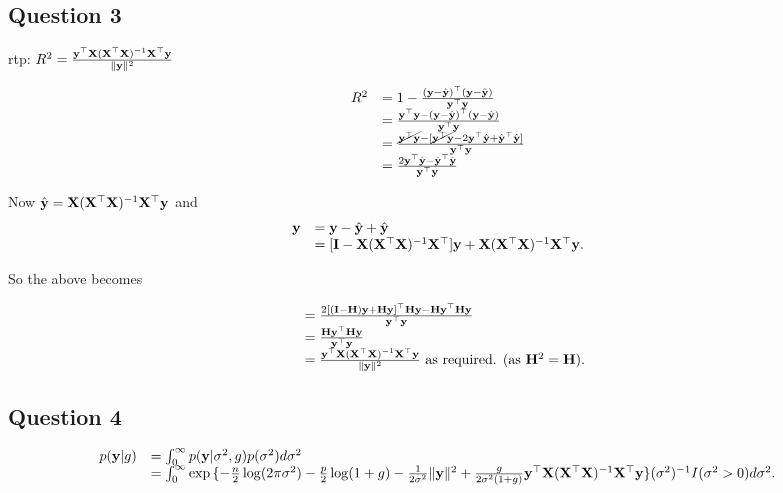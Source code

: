 \documentclass{article}[12pt]
\begin{document}
\subsection{Question 3}

rtp: $R^2 = \frac{{\bf y}^\top {\bf X} ({\bf X}^\top {\bf X})^{-1} {\bf X}^\top {\bf y}}{\| {\bf y} \|^2}$

\begin{equation*}
\begin{array}{ll}
R^2 &= 1 - \frac{({\bf y} - \hat{{\bf y}})^\top ({\bf y} - \hat{{\bf y}})}{{\bf y}^\top {\bf y}} \\
&= \frac{{\bf y}^\top {\bf y} - ({\bf y} - \hat{{\bf y}})^\top ({\bf y} - \hat{{\bf y}})}{{\bf y}^\top {\bf y}} \\
&= \frac{\cancel{{\bf y}^\top {\bf y}} - [\cancel{{\bf y}^\top {\bf y}} - 2 {\bf y}^\top \hat{{\bf y}} + \hat{{\bf y}}^\top \hat{{\bf y}}]}{{\bf y}^\top {\bf y}} \\
&= \frac{2 {\bf y}^\top \hat{{\bf y}} - \hat{{\bf y}}^\top \hat{{\bf y}}}{{\bf y}^\top {\bf y}}
\end{array}
\end{equation*}

Now $\hat{{\bf y}} = {\bf X} ({\bf X}^\top {\bf X})^{-1} {\bf X}^\top {\bf y}$ and
\begin{equation*}
\begin{array}{ll}
{\bf y} &= {\bf y} - \hat{{\bf y}} + \hat{{\bf y}} \\
&= [{\bf I} - {\bf X} ({\bf X}^\top {\bf X})^{-1} {\bf X}^\top] {\bf y} + {\bf X} ({\bf X}^\top {\bf X})^{-1} {\bf X}^\top {\bf y}.
\end{array}
\end{equation*}

So the above becomes

\begin{equation*}
\begin{array}{ll}
&= \frac{2[({\bf I} - {\bf H}) {\bf y} + {\bf H} {\bf y}]^\top {\bf H} {\bf y} - {\bf H} {\bf y}^\top {\bf H} {\bf y}}{{\bf y}^\top {\bf y}} \\
&= \frac{{\bf H} {\bf y}^\top {\bf H} {\bf y}}{{\bf y}^\top {\bf y}} \\
&= \frac{{\bf y}^\top {\bf X} ({\bf X}^\top {\bf X})^{-1} {\bf X}^\top {\bf y}}{\| {\bf y} \|^2} \text{ as required. } (\text{as } {\bf H}^2 = {\bf H}).
\end{array}
\end{equation*}

\subsection{Question 4}
\begin{equation*}
\begin{array}{ll}
p({\bf y} | g) &= \int_0^\infty p({\bf y} | \sigma^2, g) p(\sigma^2) d \sigma^2 \\
&= \int_0^\infty \exp{\{ -\frac{n}{2} \log (2 \pi \sigma^2) - \frac{p}{2} \log(1 + g)
	 - \frac{1}{2 \sigma^2} \| {\bf y}\|^2
	 + \frac{g}{2 \sigma^2 (1 + g)} {\bf y}^\top {\bf X}({\bf X}^\top {\bf X})^{-1} {\bf X}^\top {\bf y}\}}
	 (\sigma^2)^{-1} I(\sigma^2 > 0) d \sigma^2.
\end{array}
\end{equation*}
\end{document}
